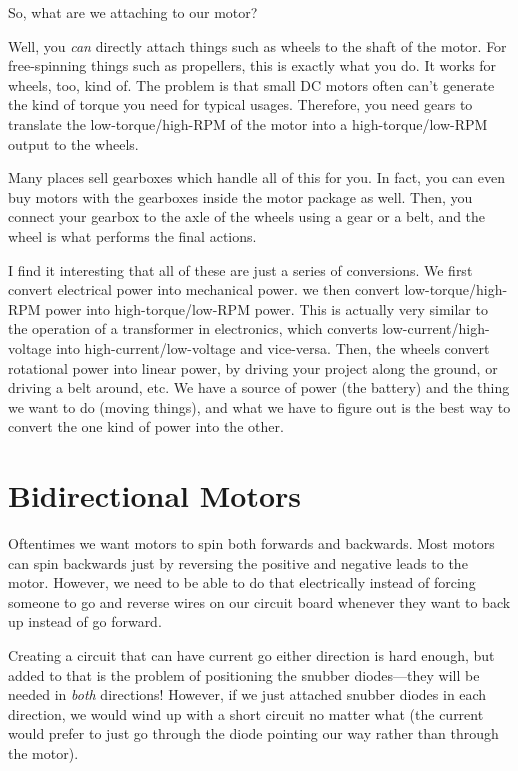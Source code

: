 So, what are we attaching to our motor?

Well, you \emph{can} directly attach things such as wheels to the shaft of the motor.
For free-spinning things such as propellers, this is exactly what you do.
It works for wheels, too, kind of.
The problem is that small DC motors often can't generate the kind of torque you need for typical usages.
Therefore, you need gears to translate the low-torque/high-RPM of the motor into a high-torque/low-RPM output to the wheels.

Many places sell gearboxes which handle all of this for you.
In fact, you can even buy motors with the gearboxes inside the motor package as well.
Then, you connect your gearbox to the axle of the wheels using a gear or a belt, and the wheel is what performs the final actions.

I find it interesting that all of these are just a series of conversions.
We first convert electrical power into mechanical power.
we then convert low-torque/high-RPM power into high-torque/low-RPM power.
This is actually very similar to the operation of a transformer in electronics, which converts low-current/high-voltage into high-current/low-voltage and vice-versa.
Then, the wheels convert rotational power into linear power, by driving your project along the ground, or driving a belt around, etc.
We have a source of power (the battery) and the thing we want to do (moving things), and what we have to figure out is the best way to convert the one kind of power into the other.

\section{Bidirectional Motors}

Oftentimes we want motors to spin both forwards and backwards.
Most motors can spin backwards just by reversing the positive and negative leads to the motor.
However, we need to be able to do that electrically instead of forcing someone to go and reverse wires on our circuit board whenever they want to back up instead of go forward.

Creating a circuit that can have current go either direction is hard enough, but added to that is the problem of positioning the snubber diodes---they will be needed in \emph{both} directions!
However, if we just attached snubber diodes in each direction, we would wind up with a short circuit no matter what (the current would prefer to just go through the diode pointing our way rather than through the motor).


